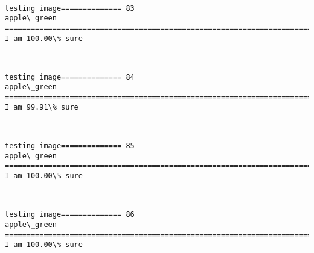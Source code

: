\documentclass[11pt]{article}
\begin{document}
    \begin{center}
    \end{center}
    { \hspace*{\fill} \\}
    
    \begin{Verbatim}[commandchars=\\\{\}]
testing image============== 83
apple\_green
============================================================================
I am 100.00\% sure

    \end{Verbatim}

    \begin{center}
    \end{center}
    { \hspace*{\fill} \\}
    
    \begin{Verbatim}[commandchars=\\\{\}]
testing image============== 84
apple\_green
============================================================================
I am 99.91\% sure

    \end{Verbatim}

    \begin{center}
    \end{center}
    { \hspace*{\fill} \\}
    
    \begin{Verbatim}[commandchars=\\\{\}]
testing image============== 85
apple\_green
============================================================================
I am 100.00\% sure

    \end{Verbatim}

    \begin{center}
    \end{center}
    { \hspace*{\fill} \\}
    
    \begin{Verbatim}[commandchars=\\\{\}]
testing image============== 86
apple\_green
============================================================================
I am 100.00\% sure

    \end{Verbatim}
\end{document}
